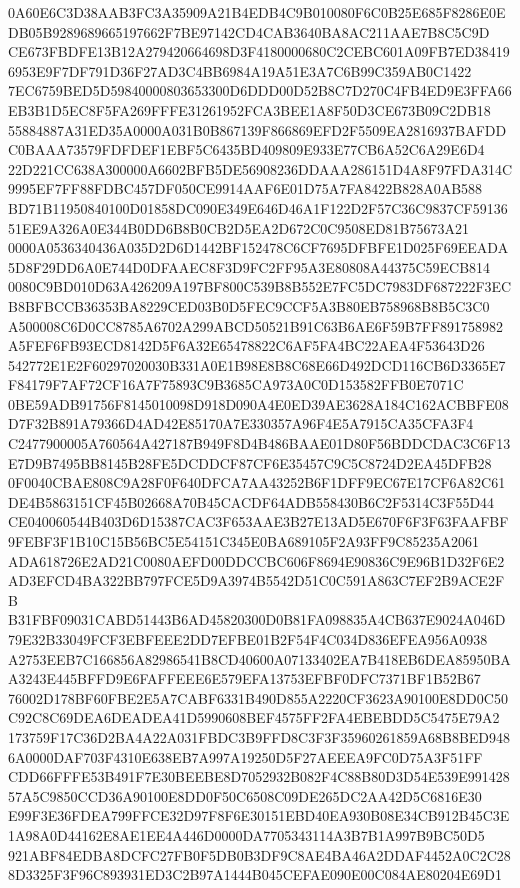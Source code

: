 \documentclass[UTF8,fontset=fandol,zihao=-4,a4paper]{ctexart}
\begin{document}
{{0A60E6C3D38AAB3FC3A35909A21B4EDB4C9B010080F6C0B25E685F8286E0EDB05B9289689665197662F7BE97142CD4CAB3640BA8AC211AAE7B8C5C9D
CE673FBDFE13B12A279420664698D3F4180000680C2CEBC601A09FB7ED384196953E9F7DF791D36F27AD3C4BB6984A19A51E3A7C6B99C359AB0C1422
7EC6759BED5D59840000803653300D6DDD00D52B8C7D270C4FB4ED9E3FFA66EB3B1D5EC8F5FA269FFFE31261952FCA3BEE1A8F50D3CE673B09C2DB18
55884887A31ED35A0000A031B0B867139F866869EFD2F5509EA2816937BAFDDC0BAAA73579FDFDEF1EBF5C6435BD409809E933E77CB6A52C6A29E6D4
22D221CC638A300000A6602BFB5DE56908236DDAAA286151D4A8F97FDA314C9995EF7FF88FDBC457DF050CE9914AAF6E01D75A7FA8422B828A0AB588
BD71B11950840100D01858DC090E349E646D46A1F122D2F57C36C9837CF5913651EE9A326A0E344B0DD6B8B0CB2D5EA2D672C0C9508ED81B75673A21
0000A0536340436A035D2D6D1442BF152478C6CF7695DFBFE1D025F69EEADA5D8F29DD6A0E744D0DFAAEC8F3D9FC2FF95A3E80808A44375C59ECB814
0080C9BD010D63A426209A197BF800C539B8B552E7FC5DC7983DF687222F3ECB8BFBCCB36353BA8229CED03B0D5FEC9CCF5A3B80EB758968B8B5C3C0
A500008C6D0CC8785A6702A299ABCD50521B91C63B6AE6F59B7FF891758982A5FEF6FB93ECD8142D5F6A32E65478822C6AF5FA4BC22AEA4F53643D26
542772E1E2F60297020030B331A0E1B98E8B8C68E66D492DCD116CB6D3365E7F84179F7AF72CF16A7F75893C9B3685CA973A0C0D153582FFB0E7071C
0BE59ADB91756F8145010098D918D090A4E0ED39AE3628A184C162ACBBFE08D7F32B891A79366D4AD42E85170A7E330357A96F4E5A7915CA35CFA3F4
C2477900005A760564A427187B949F8D4B486BAAE01D80F56BDDCDAC3C6F13E7D9B7495BB8145B28FE5DCDDCF87CF6E35457C9C5C8724D2EA45DFB28
0F0040CBAE808C9A28F0F640DFCA7AA43252B6F1DFF9EC67E17CF6A82C61DE4B5863151CF45B02668A70B45CACDF64ADB558430B6C2F5314C3F55D44
CE040060544B403D6D15387CAC3F653AAE3B27E13AD5E670F6F3F63FAAFBF9FEBF3F1B10C15B56BC5E54151C345E0BA689105F2A93FF9C85235A2061
ADA618726E2AD21C0080AEFD00DDCCBC606F8694E90836C9E96B1D32F6E2AD3EFCD4BA322BB797FCE5D9A3974B5542D51C0C591A863C7EF2B9ACE2FB
B31FBF09031CABD51443B6AD45820300D0B81FA098835A4CB637E9024A046D79E32B33049FCF3EBFEEE2DD7EFBE01B2F54F4C034D836EFEA956A0938
A2753EEB7C166856A82986541B8CD40600A07133402EA7B418EB6DEA85950BAA3243E445BFFD9E6FAFFEEE6E579EFA13753EFBF0DFC7371BF1B52B67
76002D178BF60FBE2E5A7CABF6331B490D855A2220CF3623A90100E8DD0C50C92C8C69DEA6DEADEA41D5990608BEF4575FF2FA4EBEBDD5C5475E79A2
173759F17C36D2BA4A22A031FBDC3B9FFD8C3F3F35960261859A68B8BED9486A0000DAF703F4310E638EB7A997A19250D5F27AEEEA9FC0D75A3F51FF
CDD66FFFE53B491F7E30BEEBE8D7052932B082F4C88B80D3D54E539E99142857A5C9850CCD36A90100E8DD0F50C6508C09DE265DC2AA42D5C6816E30
E99F3E36FDEA799FFCE32D97F8F6E30151EBD40EA930B08E34CB912B45C3E1A98A0D44162E8AE1EE4A446D0000DA7705343114A3B7B1A997B9BC50D5
921ABF84EDBA8DCFC27FB0F5DB0B3DF9C8AE4BA46A2DDAF4452A0C2C288D3325F3F96C893931ED3C2B97A1444B045CEFAE090E00C084AE80204E69D1
}}
\end{document}
